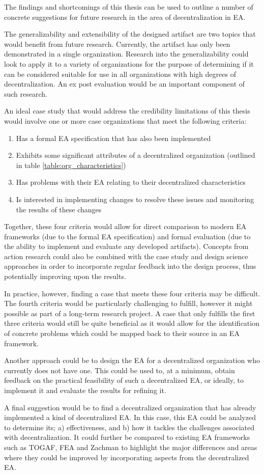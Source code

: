 The findings and shortcomings of this thesis can be used to outline a number of concrete suggestions for future research in the area of decentralization in EA. 

The generalizability and extensibility of the designed artifact are two topics that would benefit from future research. Currently, the artifact has only been demonstrated in a single organization. Research into the generalizability could look to apply it to a variety of organizations for the purpose of determining if it can be considered suitable for use in all organizations with high degrees of decentralization. An ex post evaluation would be an important component of such research.

An ideal case study that would address the credibility limitations of this thesis would involve one or more case organizations that meet the following criteria:

\begin{enumerate}
\item Has a formal EA specification that has also been implemented
\item Exhibits some significant attributes of a decentralized organization (outlined in table \ref{table:org_characteristics})
\item Has problems with their EA relating to their decentralized characteristics
\item Is interested in implementing changes to resolve these issues and monitoring the results of these changes
\end{enumerate}

Together, these four criteria would allow for direct comparison to modern EA frameworks (due to the formal EA specification) and formal evaluation (due to the ability to implement and evaluate any developed artifacts). Concepts from action research could also be combined with the case study and design science approaches in order to incorporate regular feedback into the design process, thus potentially improving upon the results. 

In practice, however, finding a case that meets these four criteria may be difficult. The fourth criteria would be particularly challenging to fulfill, however it might possible as part of a long-term research project. A case that only fulfills the first three criteria would still be quite beneficial as it would allow for the identification of concrete problems which could be mapped back to their source in an EA framework. 

Another approach could be to design the EA for a decentralized organization who currently does not have one. This could be used to, at a minimum, obtain feedback on the practical feasibility of such a decentralized EA, or ideally, to implement it and evaluate the results for refining it. 

A final suggestion would be to find a decentralized organization that has already implemented a kind of decentralized EA. In this case, this EA could be analyzed to determine its; a) effectiveness, and b) how it tackles the challenges associated with decentralization. It could further be compared to existing EA frameworks such as TOGAF, FEA and Zachman to highlight the major differences and areas where they could be improved by incorporating aspects from the decentralized EA. 